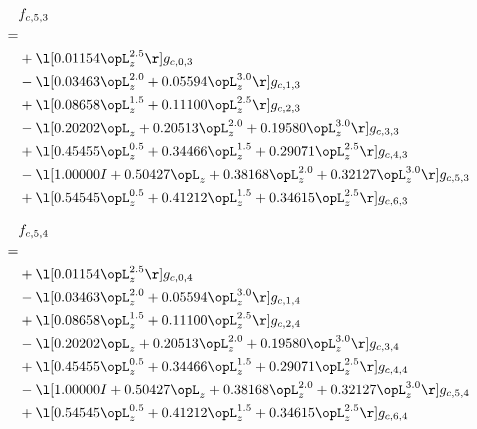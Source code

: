 \begin{alignat}{2} 
\label{eq:f_53_0} 
& f_{c,5,3} \nonumber \\ 
 = \\ 
& + \l[  0.01154 \opL_z^{2.5}  \r] g_{c,0,3} \nonumber \\ 
& - \l[  0.03463 \opL_z^{2.0} +  0.05594 \opL_z^{3.0}  \r] g_{c,1,3} \nonumber \\ 
& + \l[  0.08658 \opL_z^{1.5} +  0.11100 \opL_z^{2.5}  \r] g_{c,2,3} \nonumber \\ 
& - \l[  0.20202 \opL_z +  0.20513 \opL_z^{2.0} +  0.19580 \opL_z^{3.0}  \r] g_{c,3,3} \nonumber \\ 
& + \l[  0.45455 \opL_z^{0.5} +  0.34466 \opL_z^{1.5} +  0.29071 \opL_z^{2.5}  \r] g_{c,4,3} \nonumber \\ 
& - \l[  1.00000 I +  0.50427 \opL_z +  0.38168 \opL_z^{2.0} +  0.32127 \opL_z^{3.0}  \r] g_{c,5,3} \nonumber \\ 
& + \l[  0.54545 \opL_z^{0.5} +  0.41212 \opL_z^{1.5} +  0.34615 \opL_z^{2.5}  \r] g_{c,6,3} \nonumber \\ 
\end{alignat} 


\begin{alignat}{2} 
\label{eq:f_54_0} 
& f_{c,5,4} \nonumber \\ 
 = \\ 
& + \l[  0.01154 \opL_z^{2.5}  \r] g_{c,0,4} \nonumber \\ 
& - \l[  0.03463 \opL_z^{2.0} +  0.05594 \opL_z^{3.0}  \r] g_{c,1,4} \nonumber \\ 
& + \l[  0.08658 \opL_z^{1.5} +  0.11100 \opL_z^{2.5}  \r] g_{c,2,4} \nonumber \\ 
& - \l[  0.20202 \opL_z +  0.20513 \opL_z^{2.0} +  0.19580 \opL_z^{3.0}  \r] g_{c,3,4} \nonumber \\ 
& + \l[  0.45455 \opL_z^{0.5} +  0.34466 \opL_z^{1.5} +  0.29071 \opL_z^{2.5}  \r] g_{c,4,4} \nonumber \\ 
& - \l[  1.00000 I +  0.50427 \opL_z +  0.38168 \opL_z^{2.0} +  0.32127 \opL_z^{3.0}  \r] g_{c,5,4} \nonumber \\ 
& + \l[  0.54545 \opL_z^{0.5} +  0.41212 \opL_z^{1.5} +  0.34615 \opL_z^{2.5}  \r] g_{c,6,4} \nonumber \\ 
\end{alignat} 



